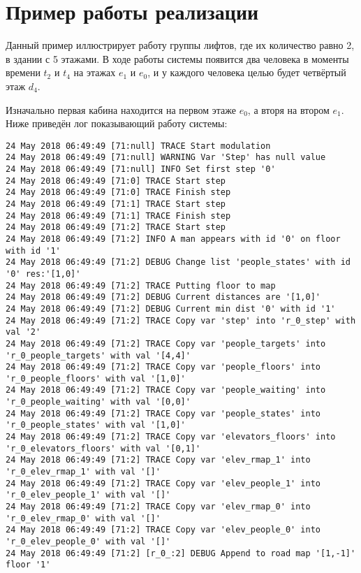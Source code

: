 \section{ Пример работы реализации}

	Данный пример иллюстрирует работу группы лифтов, где их количество равно 2, в здании с 5 этажами.
		В ходе работы системы появится два человека в моменты времени $t_2$ и $t_4$ на этажах $e_1$ и $e_0$,
		и у каждого человека целью будет четвёртый этаж $d_4$.

	Изначально первая кабина находится на первом этаже $e_0$, а вторя на втором $e_1$.
		Ниже приведён лог показывающий работу системы:
\begin{lstlisting}[basicstyle=\scriptsize]
24 May 2018 06:49:49 [71:null] TRACE Start modulation
24 May 2018 06:49:49 [71:null] WARNING Var 'Step' has null value
24 May 2018 06:49:49 [71:null] INFO Set first step '0'
24 May 2018 06:49:49 [71:0] TRACE Start step
24 May 2018 06:49:49 [71:0] TRACE Finish step
24 May 2018 06:49:49 [71:1] TRACE Start step
24 May 2018 06:49:49 [71:1] TRACE Finish step
24 May 2018 06:49:49 [71:2] TRACE Start step
24 May 2018 06:49:49 [71:2] INFO A man appears with id '0' on floor with id '1'
24 May 2018 06:49:49 [71:2] DEBUG Change list 'people_states' with id '0' res:'[1,0]'
24 May 2018 06:49:49 [71:2] TRACE Putting floor to map
24 May 2018 06:49:49 [71:2] DEBUG Current distances are '[1,0]'
24 May 2018 06:49:49 [71:2] DEBUG Current min dist '0' with id '1'
24 May 2018 06:49:49 [71:2] TRACE Copy var 'step' into 'r_0_step' with val '2'
24 May 2018 06:49:49 [71:2] TRACE Copy var 'people_targets' into 'r_0_people_targets' with val '[4,4]'
24 May 2018 06:49:49 [71:2] TRACE Copy var 'people_floors' into 'r_0_people_floors' with val '[1,0]'
24 May 2018 06:49:49 [71:2] TRACE Copy var 'people_waiting' into 'r_0_people_waiting' with val '[0,0]'
24 May 2018 06:49:49 [71:2] TRACE Copy var 'people_states' into 'r_0_people_states' with val '[1,0]'
24 May 2018 06:49:49 [71:2] TRACE Copy var 'elevators_floors' into 'r_0_elevators_floors' with val '[0,1]'
24 May 2018 06:49:49 [71:2] TRACE Copy var 'elev_rmap_1' into 'r_0_elev_rmap_1' with val '[]'
24 May 2018 06:49:49 [71:2] TRACE Copy var 'elev_people_1' into 'r_0_elev_people_1' with val '[]'
24 May 2018 06:49:49 [71:2] TRACE Copy var 'elev_rmap_0' into 'r_0_elev_rmap_0' with val '[]'
24 May 2018 06:49:49 [71:2] TRACE Copy var 'elev_people_0' into 'r_0_elev_people_0' with val '[]'
24 May 2018 06:49:49 [71:2] [r_0_:2] DEBUG Append to road map '[1,-1]' floor '1'

\end{lstlisting}
